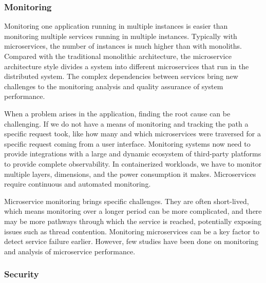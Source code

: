 \subsubsection{Monitoring}%


Monitoring one application running in multiple instances is easier than monitoring multiple services running in multiple instances. Typically with microservices, the number of instances is much higher than with monoliths.\cite{Kalske2017paper} Compared with the traditional monolithic architecture, the microservice architecture style divides a system into different microservices that run in the distributed system. The complex dependencies between services bring new challenges to the monitoring analysis and quality assurance of system performance.\cite{Zhihui2020, Venugopal2017}

When a problem arises in the application, finding the root cause can be challenging. If we do not have a means of monitoring and tracking the path a specific request took, like how many and which microservices were traversed for a specific request coming from a user interface. Monitoring systems now need to provide integrations with a large and dynamic ecosystem of third-party platforms to provide complete observability.\cite{Netflix} In containerized workloads, we have to monitor multiple layers, dimensions, and the power consumption it makes.\cite{Kristiani2020} Microservices require continuous and automated monitoring.

Microservice monitoring brings specific challenges. They are often short-lived, which means monitoring over a longer period can be more complicated, and there may be more pathways through which the service is reached, potentially exposing issues such as thread contention.\cite{Zhang2019} Monitoring microservices can be a key factor to detect service failure earlier. However, few studies have been done on monitoring and analysis of microservice performance.\cite{Saman2017, Monterio2018}

\subsubsection{Security}%

